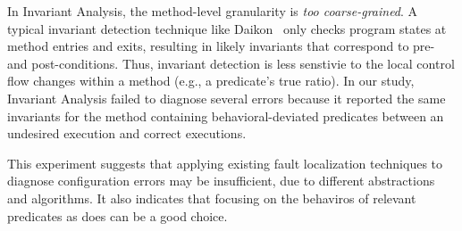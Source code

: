 In Invariant Analysis, the method-level granularity is \textit{too coarse-grained}.
A typical invariant detection technique like Daikon~\cite{Ernst:1999}
only checks program states at method entries and exits, resulting in likely invariants that
correspond to pre- and post-conditions. Thus, invariant detection is less
senstivie to the local control flow changes within a method (e.g., a predicate's
true ratio). In our study, Invariant Analysis failed to diagnose several errors
because it reported the same invariants for the method containing behavioral-deviated predicates between an undesired execution and correct executions.





This experiment suggests that applying existing fault localization
techniques to diagnose configuration errors may be insufficient, due
to different abstractions and algorithms. It also indicates that
focusing on the behaviros of relevant predicates as \ourtool does
 can be a good choice.
